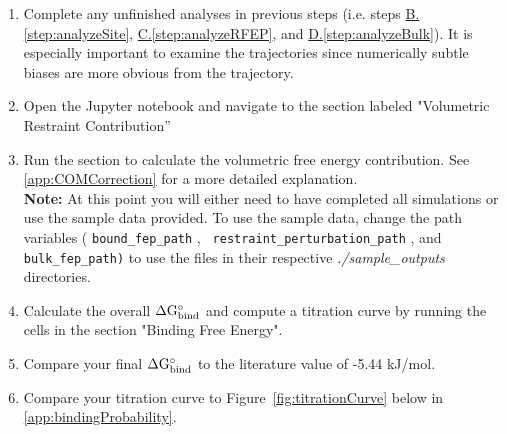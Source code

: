 \documentclass[9pt,tutorial]{Styling/livecoms}
\newcommand{\filepath}[1]{\textit{#1}}
\newcommand{\textInput}[1]{
  \texttt{#1}
}
\begin{document}
    \begin{enumerate}
    \item Complete any unfinished analyses in previous steps (i.e. steps \hyperref[step:analyzeSite]{B.\ref{step:analyzeSite}}, \hyperref[step:analyzeRFEP]{C.\ref{step:analyzeRFEP}}, and \hyperref[step:analyzeBulk]{D.\ref{step:analyzeBulk}}).
    It is especially important to examine the trajectories since numerically subtle biases are more obvious from the trajectory.
    \item Open the Jupyter notebook and navigate to the section labeled "Volumetric Restraint Contribution''
    \item Run the section to calculate the volumetric free energy contribution.\label{step:dGV}
    See \ref{app:COMCorrection} for a more detailed explanation.\\
    \textbf{Note:} At this point you will either need to have completed all simulations or use the sample data provided. To use the sample data, change the path variables (\textInput{bound\_fep\_path},\textInput{ restraint\_perturbation\_path}, and \textInput{bulk\_fep\_path\textrm{)}} to use the files in their respective \filepath{./sample\_outputs} directories. 
    \item Calculate the overall $\Delta \rm G_{bind}^\circ$ and compute a titration curve by running the cells in the section "Binding Free Energy".
    \item Compare your final $\Delta \rm G_{bind}^\circ$ to the literature value of -5.44 kJ/mol\cite{Merski2013}.
    \item Compare your titration curve to Figure~\ref{fig:titrationCurve} below in \ref{app:bindingProbability}.
\end{enumerate}
\end{document}

